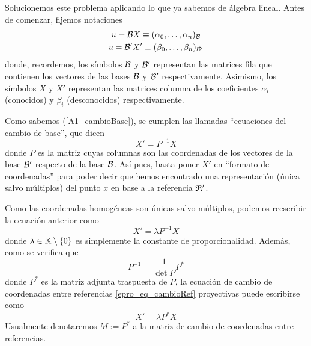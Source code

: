 Solucionemos este problema aplicando lo que ya sabemos de álgebra lineal. Antes de comenzar, fijemos notaciones
\begin{gather*}
	u=\mathcal{B}X\equiv(\alpha_0,\dots,\alpha_n)_{\mathcal{B}}\\
	u=\mathcal{B}'X'\equiv(\beta_0,\dots,\beta_n)_{\mathcal{B}'}
\end{gather*}
donde, recordemos, los símbolos $\mathcal{B}$ y $\mathcal{B}'$ representan las matrices fila que contienen los vectores de las bases $\mathcal{B}$ y $\mathcal{B}'$ respectivamente. Asimismo, los símbolos $X$ y $X'$ representan las matrices columna de los coeficientes $\alpha_i$ (conocidos) y $\beta_i$ (desconocidos) respectivamente.

Como sabemos (\ref{A1_cambioBase}), se cumplen las llamadas ``ecuaciones del cambio de base'', que dicen
\begin{equation*}
	X'=P^{-1}X
\end{equation*}
donde $P$ es la matriz cuyas columnas son las coordenadas de los vectores de la base $\mathcal{B}'$ respecto de la base $\mathcal{B}$. Así pues, basta poner $X'$ en ``formato de coordenadas'' para poder decir que hemos encontrado una representación (única salvo múltiplos) del punto $x$ en base a la referencia $\mathfrak{R}'$.

Como las coordenadas homogéneas son únicas salvo múltiplos, podemos reescribir la ecuación anterior como
\begin{equation}
\label{epro_eq_cambioRef}
	 X'=\lambda P^{-1}X
\end{equation}
donde $\lambda\in\mathbb{K}\setminus\{0\}$ es simplemente la constante de proporcionalidad. Además, como se verifica que
\begin{equation*}
	P^{-1}=\frac{1}{\det{P}}P^*
\end{equation*}
donde $P^*$ es la matriz adjunta traspuesta de $P$, la ecuación de cambio de coordenadas entre referencias \eqref{epro_eq_cambioRef} proyectivas puede escribirse como
\begin{equation}
	X'=\lambda P^*X
\end{equation}
Usualmente denotaremos $M:=P^*$ a la matriz de cambio de coordenadas entre referencias.

